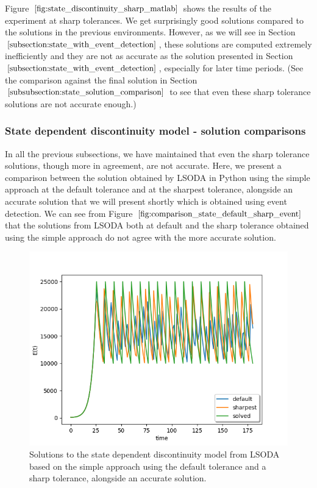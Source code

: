 Figure $\ref{fig:state_discontinuity_sharp_matlab}$ shows the results of the experiment at sharp tolerances. We get surprisingly good solutions compared to the solutions in the previous environments. However, as we will see in Section $\ref{subsection:state_with_event_detection}$, these solutions are computed extremely inefficiently and they are not as accurate as the solution presented in Section $\ref{subsection:state_with_event_detection}$, especially for later time periods. (See the comparison against the final solution in Section $\ref{subsubsection:state_solution_comparison}$ to see that even these sharp tolerance solutions are not accurate enough.)


\subsubsection{State dependent discontinuity model - solution comparisons}
\label{subsubsection:state_solution_comparison}
In all the previous subsections, we have maintained that even the sharp tolerance solutions, though more in agreement, are not accurate. Here, we present a comparison between the solution obtained by LSODA in Python using the simple approach at the default tolerance and at the sharpest tolerance, alongside an accurate solution that we will present shortly which is obtained using event detection. We can see from Figure $\ref{fig:comparison_state_default_sharp_event}$ that the solutions from LSODA both at default and the sharp tolerance obtained using the simple approach do not agree with the more accurate solution. 

\begin{figure}[H]
\centering
\includegraphics[width=0.7\linewidth]{./figures/comparison_state_default_sharp_event}
\caption{Solutions to the state dependent discontinuity model from LSODA based on the simple approach using the default tolerance and a sharp tolerance, alongside an accurate solution.}
\label{fig:comparison_state_default_sharp_event}
\end{figure}

